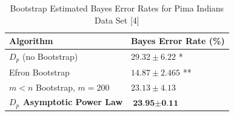 \documentclass{article}
\begin{document}
	
		
	\begin{table}[!h]		
		\caption{Bootstrap Estimated Bayes Error Rates for Pima Indians Data Set [4]}
		\begin{center}
			\begin{tabular}[!h]{ |p{5cm}||p{4cm}|  }
				\hline
				Algorithm & Bayes Error Rate (\%) \\ [0.5ex] 
				\hline\hline
						$D_p$ (no Bootstrap) & $29.32 \pm 6.22$ * \\
						Efron Bootstrap  & $14.87 \pm 2.465$ ** 	\\
						$m < n$ Bootstrap, $m=200$ & $23.13 \pm 4.13$ 	\\
				\textbf{$D_p$ Asymptotic Power Law} & $\textbf{23.95} \pm \textbf{0.11}$\\ 
				\hline 		
			\end{tabular}
		\end{center}
	\end{table}
	
\end{document}
